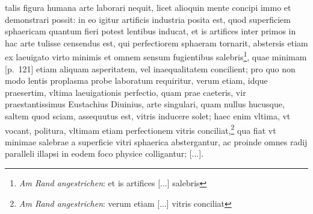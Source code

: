 \pend \pstart [p.~120] [...] talis figura humana arte laborari nequit, licet alioquin mente concipi immo et demonstrari possit: in eo igitur artificis industria posita est, quod superficiem sphaericam quantum fieri potest lentibus\protect{} inducat, et is artifices inter primos in hac arte tulisse censendus est, qui perfectiorem sphaeram tornarit, abstersis etiam ex laeuigato virto minimis et omnem sensum fugientibus salebris\footnote{\textit{Am Rand angestrichen}: et is artifices [...] salebris}, quae minimam [p.~121] etiam aliquam asperitatem, vel inaequalitatem concilient; pro quo non modo lentis\protect{} proplasma probe laboratum requiritur, verum etiam, idque praesertim, vltima laeuigationis perfectio, quam prae caeteris, vir praestantissimus Eustachius Diuinius\protect{}, arte singulari, quam nullus hucusque, saltem quod sciam, assequutus est, vitris inducere solet; haec enim vltima, vt vocant, politura, vltimam etiam perfectionem vitris conciliat,\footnote{\textit{Am Rand angestrichen}: verum etiam [...] vitris conciliat} qua fiat vt minimae salebrae a superficie vitri sphaerica abstergantur, ac proinde omnes radij paralleli illapsi in eodem foco\protect{} physice colligantur; [...].